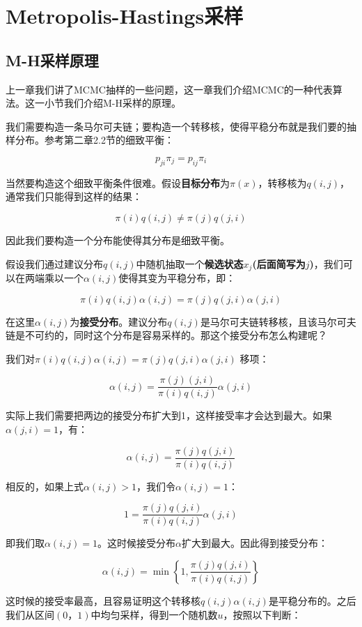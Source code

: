 \section{Metropolis-Hastings采样}

\subsection{M-H采样原理}

上一章我们讲了MCMC抽样的一些问题，这一章我们介绍MCMC的一种代表算法。这一小节我们介绍M-H采样的原理。

我们需要构造一条马尔可夫链；要构造一个转移核，使得平稳分布就是我们要的抽样分布。参考第二章2.2节的细致平衡：

\[p_{ji}\pi_{j}=p_{ij}\pi_{i}\]

当然要构造这个细致平衡条件很难。假设\textbf{目标分布}为\(\pi(x)\)，转移核为\(q(i,j)\)，通常我们只能得到这样的结果：

\[\pi(i)q(i,j) \neq \pi(j) q(j,i)\]

因此我们要构造一个分布能使得其分布是细致平衡。

假设我们通过建议分布\(q(i,j)\)中随机抽取一个\textbf{候选状态\(x_j\)(后面简写为\(j\))}，我们可以在两端乘以一个\(\alpha(i,j)\)使得其变为平稳分布，即：

$$\pi(i)q(i,j)\alpha(i,j) = \pi(j)q(j,i)\alpha(j,i)$$

在这里\(\alpha(i,j)\)为\textbf{接受分布}。建议分布\(q(i,j)\)是马尔可夫链转移核，且该马尔可夫链是不可约的，同时这个分布是容易采样的。那这个接受分布怎么构建呢？

我们对\( \pi(i)q(i,j)\alpha(i,j) = \pi(j)q(j,i)\alpha(j,i) \) 移项：

\[\alpha(i,j) =\frac{\pi(j)(j,i)}{\pi(i)q(i,j)}\alpha(j,i)\]

实际上我们需要把两边的接受分布扩大到1，这样接受率才会达到最大。如果\(\alpha(j,i)=1\)，有：

\[\alpha(i,j) =\frac{\pi(j)q(j,i)}{\pi(i)q(i,j)}\]

相反的，如果上式\(\alpha(i,j)>1\)，我们令\(\alpha(i,j)=1\)：

\[1=\frac{\pi(j)q(j,i)}{\pi(i)q(i,j)}\alpha(j,i)\]

即我们取\(\alpha(i,j)=1\)。这时候接受分布\(\alpha\)扩大到最大。因此得到接受分布：

\[\alpha(i,j)=\min \left\{1,\frac{\pi(j)q(j,i)}{\pi(i)q(i,j)} \right\}\]

这时候的接受率最高，且容易证明这个转移核\(q(i,j)\alpha(i,j)\)是平稳分布的。之后我们从区间\((0，1)\)中均匀采样，得到一个随机数\(u\)，按照以下判断：

